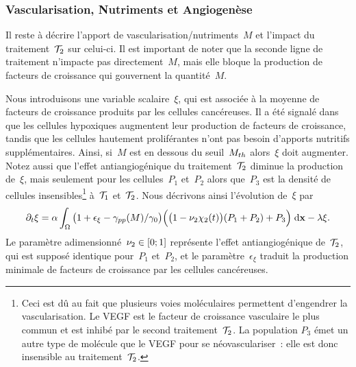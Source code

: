 \documentclass[main.tex]{subfiles}
\begin{document}
\subsubsection{Vascularisation, Nutriments et Angiogenèse}
Il reste à décrire l'apport de vascularisation/nutriments~$M$ 
et l'impact du traitement~${\mathcal T_2}$ sur celui-ci. Il est important de noter que la seconde ligne de traitement n'impacte pas directement~$M$, mais elle bloque la production de facteurs de croissance qui gouvernent la quantité~$M$.

Nous introduisons une variable scalaire~$\xi$, qui est associée à la moyenne de facteurs de croissance produits par les cellules cancéreuses. 
Il a été signalé dans~\cite{Holmes2007} que les cellules hypoxiques augmentent leur production de facteurs de croissance, tandis que les cellules hautement proliférantes n'ont pas besoin d'apports nutritifs supplémentaires. Ainsi, si~$M$ est en dessous du seuil~$M_{th}$ alors~$\xi$ doit augmenter. 
Notez aussi que l'effet antiangiogénique du 
traitement~${\mathcal T_2}$ diminue la production
de~$\xi$, mais seulement pour les cellules~$P_1$ et~$P_2$ alors que~$P_3$ est la densité de cellules insensibles\footnote{Ceci est dû au fait que plusieurs voies moléculaires permettent d'engendrer la vascularisation. Le VEGF est le facteur de croissance vasculaire le plus commun  et est inhibé par le second traitement~${\mathcal T_2}$. La population $P_3$ émet un autre type de molécule que le VEGF pour se néovasculariser~: elle est donc insensible au traitement~${\mathcal T_2}$.} à~${\mathcal T_1}$ et~${\mathcal T_2}$.
Nous décrivons ainsi l'évolution de~$\xi$ par
\begin{equation}\label{eq_xi}
\partial_t \xi = \alpha \int_\Omega \big(1+\epsilon_{\xi} - \gamma_{pp}(M) / \gamma_0 \big)\Big(\big(1-\nu_2\chi_2(t)\big)(P_1+P_2)+P_3\Big) \textrm{\;d}\mathbf{x} - \lambda \xi.
\end{equation}
Le paramètre adimensionné~$\nu_2\in [0;1]$ représente l'effet antiangiogénique de~${\mathcal T_2}$, qui est supposé identique pour~$P_1$ et~$P_2$, et le paramètre~$\epsilon_{\xi}$ traduit la production minimale de facteurs de croissance par les cellules cancéreuses. 
\end{document}
